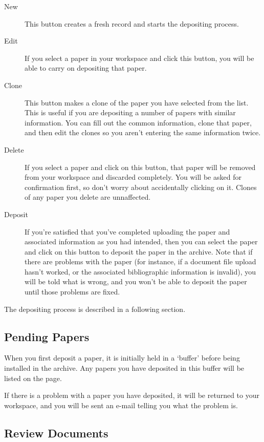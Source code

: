 \begin{description}
\item[New] This button creates a fresh record and starts the depositing process.
\item[Edit] If you select a paper in your workspace and click this button, you will be able to carry on depositing that paper.
\item[Clone] This button makes a clone of the paper you have selected from the list. This is useful if you are depositing a number of papers with similar information. You can fill out the common information, clone that paper, and then edit the clones so you aren't entering the same information twice.
\item[Delete] If you select a paper and click on this button, that paper will be removed from your workspace and discarded completely. You will be asked for confirmation first, so don't worry about accidentally clicking on it. Clones of any paper you delete are unnaffected.
\item[Deposit] If you're satisfied that you've completed uploading the paper and associated information as you had intended, then you can select the paper and click on this button to deposit the paper in the archive. Note that if there are problems with the paper (for instance, if a document file upload hasn't worked, or the associated bibliographic information is invalid), you will be told what is wrong, and you won't be able to deposit the paper until those problems are fixed.
\end{description}

The depositing process is described in a following section.


\subsection{Pending Papers}

When you first deposit a paper, it is initially held in a `buffer' before being installed in the archive. Any papers you have deposited in this buffer will be listed on the page.

If there is a problem with a paper you have deposited, it will be returned to your workspace, and you will be sent an e-mail telling you what the problem is.


\subsection{Review Documents}

